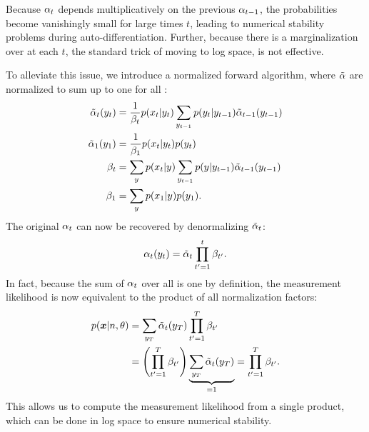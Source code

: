 Because $\alpha_{t}$ depends multiplicatively on the previous $\alpha_{t-1}$,
the probabilities become vanishingly small for large times $t$, leading to
numerical stability problems during auto-differentiation. Further, because there is a marginalization over
\states at each $t$, the standard trick of moving to log space, is not
effective.

To alleviate this issue, we introduce a normalized forward algorithm, where
$\tilde{\alpha}$ are normalized to sum up to one for all \y{}:
%
\begin{align*}
  \tilde{\alpha}_t(y_{t}) &=
    \frac{1}{\beta_t}
    p(x_{t}|y_{t})
    \sum_{y_{t-1}}
      p(y_{t} | y_{t-1})
      \tilde{\alpha}_{t-1}(y_{t-1})\\
  \tilde{\alpha}_{1}(y_{1}) &=
    \frac{1}{\beta_1}
    p(x_{t}|y_{t})
    p(y_{t})\\
  \beta_t &=
    \sum_{y_{}}
    p(x_{t}|y_{})
    \sum_{y_{t-1}}
      p(y_{} | y_{t-1})
      \tilde{\alpha}_{t-1}(y_{t-1})\\
  \beta_1 &=
    \sum_{y_{}}
    p(x_{1}|y_{})
    p(y_{1})  \text{.}\\
\end{align*}
%
The original $\alpha_{t}$ can now be recovered by denormalizing $\tilde{\alpha}_{t}$:
%
\begin{equation*}
  \alpha_t(y_{t}) = \tilde{\alpha}_t \prod_{t'=1}^t \beta_{t'}
  \text{.}
\end{equation*}
%
In fact, because the sum of $\alpha_{t}$ over all  is one by definition, the measurement likelihood is now equivalent to the product of all normalization factors:
%
\begin{align*}
  p(\bm{x}|n,\theta)
    &= \sum_{y_{T}} \tilde{\alpha}_{t}(y_{T}) \prod_{t'=1}^T \beta_{t'}\\
    &= \left( \prod_{t'=1}^T \beta_{t'} \right)
      \underbrace{\sum_{y_{T}} \tilde{\alpha}_{t}(y_{T})}_{=1}
    = \prod_{t'=1}^T \beta_{t'} \text{.}\\
\end{align*}
%
This allows us to compute the measurement likelihood from a single product,
which can be done in log space to ensure numerical stability.
